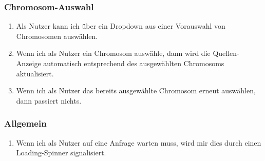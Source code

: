 \documentclass{scrartcl}
\begin{document}
\subsubsection{Chromosom-Auswahl}
\begin{enumerate}
	\item Als Nutzer kann ich über ein Dropdown aus einer Vorauswahl von Chromosomen auswählen.
	\item Wenn ich als Nutzer ein Chromosom auswähle, dann wird die Quellen-Anzeige automatisch entsprechend des ausgewählten Chromosoms aktualisiert.
	\item Wenn ich als Nutzer das bereits ausgewählte Chromosom erneut auswählen, dann passiert nichts.
\end{enumerate}

\subsubsection{Allgemein}
\begin{enumerate}
	\item Wenn ich als Nutzer auf eine Anfrage warten muss, wird mir dies durch einen Loading-Spinner signalisiert.	
\end{enumerate}
\newpage

\end{document}
